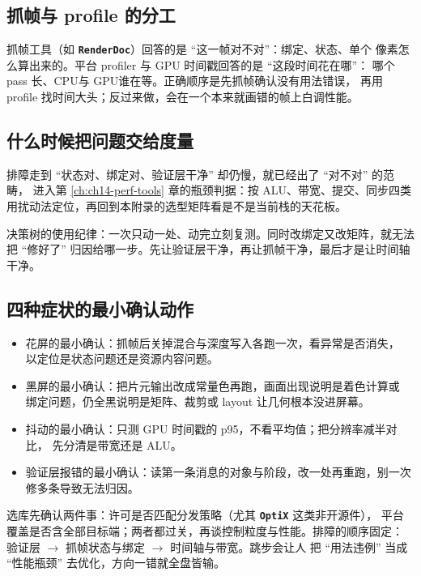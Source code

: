 \documentclass[12pt,a4paper,fontset=fandol]{ctexbook}
\newcommand{\Lib}[1]{\textbf{\texttt{#1}}}
\newcommand{\Lang}[1]{\textsf{#1}}
\newcommand{\DomCPU}{\Lang{CPU}}
\newcommand{\DomGPU}{\Lang{GPU}}
\begin{document}
\subsection{抓帧与 profile 的分工}

抓帧工具（如 \Lib{RenderDoc}）回答的是 ``这一帧对不对''：绑定、状态、单个
像素怎么算出来的。平台 profiler 与 GPU 时间戳回答的是 ``这段时间花在哪''：
哪个 pass 长、\DomCPU 与 \DomGPU 谁在等。正确顺序是先抓帧确认没有用法错误，
再用 profile 找时间大头；反过来做，会在一个本来就画错的帧上白调性能。

\subsection{什么时候把问题交给度量}

排障走到 ``状态对、绑定对、验证层干净'' 却仍慢，就已经出了 ``对不对'' 的范畴，
进入第 \ref{ch:ch14-perf-tools} 章的瓶颈判据：按 ALU、带宽、提交、同步四类
用扰动法定位，再回到本附录的选型矩阵看是不是当前栈的天花板。

决策树的使用纪律：一次只动一处、动完立刻复测。同时改绑定又改矩阵，就无法
把 ``修好了'' 归因给哪一步。先让验证层干净，再让抓帧干净，最后才是让时间轴
干净。

\subsection{四种症状的最小确认动作}

\begin{itemize}
  \item 花屏的最小确认：抓帧后关掉混合与深度写入各跑一次，看异常是否消失，
        以定位是状态问题还是资源内容问题。
  \item 黑屏的最小确认：把片元输出改成常量色再跑，画面出现说明是着色计算或
        绑定问题，仍全黑说明是矩阵、裁剪或 layout 让几何根本没进屏幕。
  \item 抖动的最小确认：只测 GPU 时间戳的 p95，不看平均值；把分辨率减半对比，
        先分清是带宽还是 ALU。
  \item 验证层报错的最小确认：读第一条消息的对象与阶段，改一处再重跑，别一次
        修多条导致无法归因。
\end{itemize}

\begin{bestpractice}[title={选型先看许可与平台，排障先让验证层归零}]
选库先确认两件事：许可是否匹配分发策略（尤其 \Lib{OptiX} 这类非开源件），
平台覆盖是否含全部目标端；两者都过关，再谈控制粒度与性能。排障的顺序固定：
验证层 $\rightarrow$ 抓帧状态与绑定 $\rightarrow$ 时间轴与带宽。跳步会让人
把 ``用法违例'' 当成 ``性能瓶颈'' 去优化，方向一错就全盘皆输。
\end{bestpractice}
\end{document}
